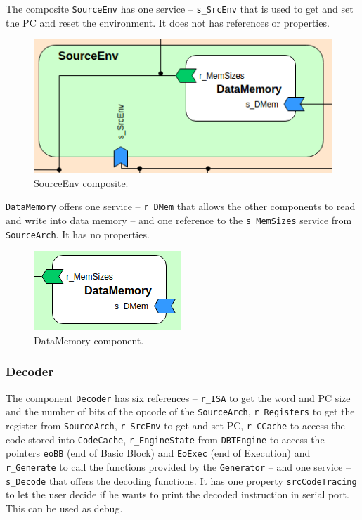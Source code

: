 \documentclass[11pt]{report}
\newcounter{subsubsubsection}[subsubsection]
\begin{document}
			\par The composite \texttt{SourceEnv} has one service -- \texttt{s\_SrcEnv} that is used to get and set the PC and reset the environment. It does not has references or properties.
			
			\begin{figure} [H]
				\centering
				\includegraphics[width=0.5\linewidth]{Images/arch-ref/SourceEnv}
				\caption{SourceEnv composite.}
				\label{fig:SourceEnv}
			\end{figure}
		
				
				\par \texttt{DataMemory} offers one service -- \texttt{r\_DMem} that allows the other components to read and write into data memory -- and one reference to the \texttt{s\_MemSizes} service from \texttt{SourceArch}. It has no properties.
		
				\begin{figure} [H]
					\centering
					\includegraphics[width=0.3\linewidth]{Images/arch-ref/DataMemory}
					\caption{DataMemory component.}
					\label{fig:DataMemory}
				\end{figure}
		
			\subsubsection{Decoder}
			
			\par The component \texttt{Decoder} has six references -- \texttt{r\_ISA} to get the word and PC size and the number of bits of the opcode of the \texttt{SourceArch}, \texttt{r\_Registers} to get the register from \texttt{SourceArch}, \texttt{r\_SrcEnv} to get and set PC, \texttt{r\_CCache} to access the code stored into \texttt{CodeCache}, \texttt{r\_EngineState} from \texttt{DBTEngine} to access the pointers \texttt{eoBB} (end of Basic Block) and \texttt{EoExec} (end of Execution) and \texttt{r\_Generate} to call the functions provided by the \texttt{Generator} -- and one service -- \texttt{s\_Decode} that offers the decoding functions. It has one property \texttt{srcCodeTracing} to let the user decide if he wants to print the decoded instruction in serial port. This can be used as debug. 
			
\end{document}
